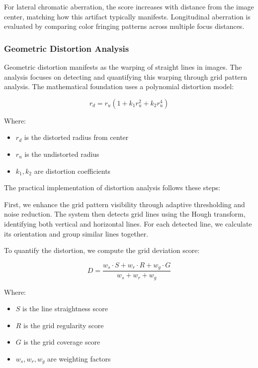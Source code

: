 For lateral chromatic aberration, the score increases with distance from the image center, matching how this artifact typically manifests. Longitudinal aberration is evaluated by comparing color fringing patterns across multiple focus distances.

\subsubsection{Geometric Distortion Analysis}
Geometric distortion manifests as the warping of straight lines in images. The analysis focuses on detecting and quantifying this warping through grid pattern analysis. The mathematical foundation uses a polynomial distortion model:

\begin{equation}
r_d = r_u \left(1 + k_1 r_u^2 + k_2 r_u^4\right)
\end{equation}

Where:
\begin{itemize}
    \item \( r_d \) is the distorted radius from center
    \item \( r_u \) is the undistorted radius
    \item \( k_1, k_2 \) are distortion coefficients
\end{itemize}

The practical implementation of distortion analysis follows these steps:

First, we enhance the grid pattern visibility through adaptive thresholding and noise reduction. The system then detects grid lines using the Hough transform, identifying both vertical and horizontal lines. For each detected line, we calculate its orientation and group similar lines together.

To quantify the distortion, we compute the grid deviation score:

\begin{equation}
D = \frac{w_s \cdot S + w_r \cdot R + w_g \cdot G}{w_s + w_r + w_g}
\end{equation}

Where:
\begin{itemize}
    \item \( S \) is the line straightness score
    \item \( R \) is the grid regularity score
    \item \( G \) is the grid coverage score
    \item \( w_s, w_r, w_g \) are weighting factors
\end{itemize}

